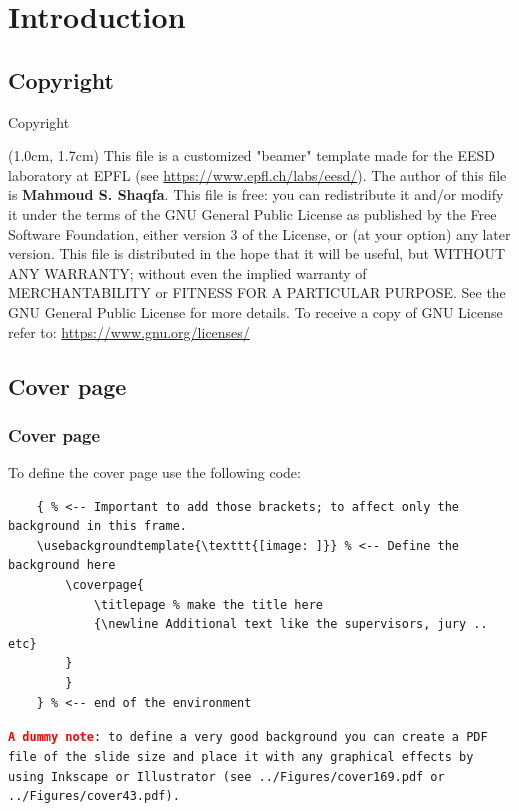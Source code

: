 \documentclass{EESD}
\begin{document}
\section{Introduction}


\subsection{Copyright}
\begin{frame}[t]{Copyright}
\begin{textblock*}{13cm}(1.0cm,  1.7cm)
    {\selectfont
    This file is a customized "beamer" template made for the EESD laboratory at EPFL (see \href{https://www.epfl.ch/labs/eesd/}{https://www.epfl.ch/labs/eesd/}). The author of this file is \textbf{Mahmoud S. Shaqfa}. This file is free: you can redistribute it and/or modify it under the terms of the GNU General Public License as published by    the Free Software Foundation, either version 3 of the License, or (at your option) any later version. This file is distributed in the hope that it will be useful, but WITHOUT ANY WARRANTY; without even the implied warranty of MERCHANTABILITY or FITNESS FOR A PARTICULAR PURPOSE.  See the GNU General Public License for more details. To receive a copy of GNU License refer to: \href{https://www.gnu.org/licenses/}{https://www.gnu.org/licenses/}
    }
\end{textblock*}
\end{frame}

\subsection{Cover page}
\begin{frame}[fragile]
\frametitle{Cover page}
    To define the cover page use the following code:
    \vspace{10pt}
    \begin{lstlisting}
    { % <-- Important to add those brackets; to affect only the background in this frame.
    \usebackgroundtemplate{\texttt{[image: ]}} % <-- Define the background here
        \coverpage{
            \titlepage % make the title here
            {\newline Additional text like the supervisors, jury .. etc}
        }
        }
    } % <-- end of the environment
    \end{lstlisting}
    \texttt{\small{\textcolor{red}{\textbf{A dummy note}}: to define a very good background you can create a PDF file of the slide size and place it with any graphical effects by using Inkscape or Illustrator (see ../Figures/cover169.pdf or ../Figures/cover43.pdf).}}
    \vspace{10pt}
\end{frame}
\end{document}
